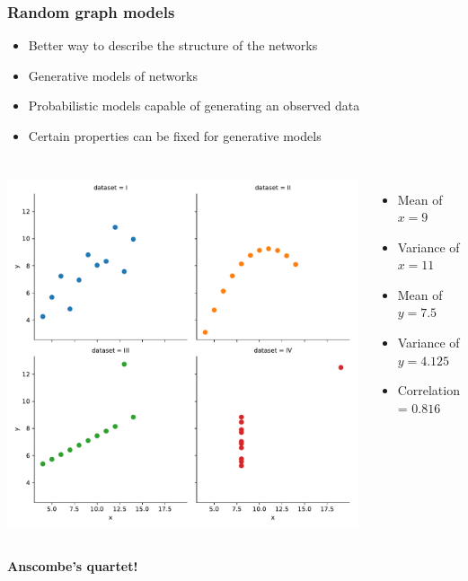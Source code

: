 \documentclass{beamer}
\begin{document}
\begin{frame}
    \frametitle{Random graph models}
    \centering

    \begin{itemize}
    \setlength\itemsep{1em}
        \item{Better way to describe the structure of the networks}
        \item{Generative models of networks}
        \item{Probabilistic models capable of generating an observed data}
        \item{Certain properties can be fixed for generative models}
    \end{itemize}
        
\end{frame}
\begin{frame}
    \frametitle{}
    \begin{columns}
    \centering
    \includegraphics[width=\columnwidth]{anscombe.pdf} 
    
    \pause
    \begin{itemize}
    \setlength\itemsep{1em}
        \item{Mean of $x = 9$}
        \item{Variance of $x = 11$}
        \item{Mean of $y = 7.5$}
        \item{Variance of $y = 4.125$}
        \item{Correlation = $0.816$}
    \end{itemize}
    \end{columns}
    \centering
    \vspace{2em}
    {\bf Anscombe's quartet!}
\end{frame}
\end{document}
